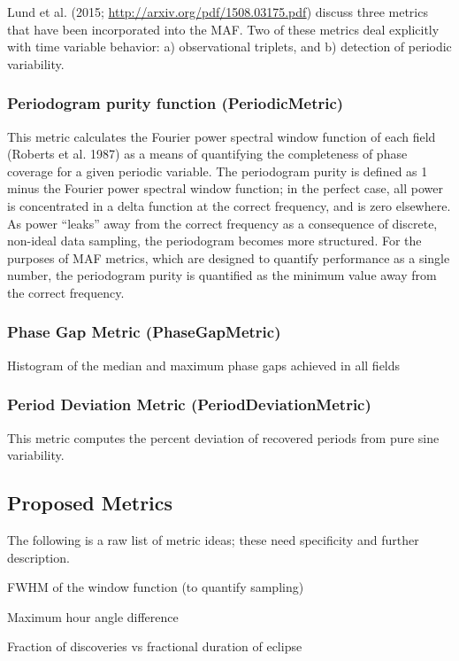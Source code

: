 Lund et al. (2015; \url{http://arxiv.org/pdf/1508.03175.pdf}) discuss three metrics that have been incorporated into the MAF. Two of these metrics deal explicitly with time variable behavior: a) observational triplets, and b) detection of periodic variability. 

\subsubsection{Periodogram purity function (PeriodicMetric)}
This metric calculates the Fourier power spectral window function of each field (Roberts et al. 1987) as a means of quantifying the completeness of phase coverage for a given periodic variable. The periodogram purity is defined as 1 minus the Fourier power spectral window function; in the perfect case, all power is concentrated in a delta function at the correct frequency, and is zero elsewhere. As power ``leaks'' away from the correct frequency as a consequence of discrete, non-ideal data sampling, the periodogram becomes more structured. For the purposes of MAF metrics, which are designed to quantify performance as a single number, the periodogram purity is quantified as the minimum value away from the correct frequency. 

\subsubsection{Phase Gap Metric (PhaseGapMetric)}
Histogram of the median and maximum phase gaps achieved in all fields

\subsubsection{Period Deviation Metric (PeriodDeviationMetric)}

This metric computes the percent deviation of recovered periods from pure sine variability.

\subsection{Proposed Metrics}

The following is a raw list of metric ideas; these need specificity and further description. 

FWHM of the window function (to quantify sampling)

Maximum hour angle difference 

Fraction of discoveries vs fractional duration of eclipse

